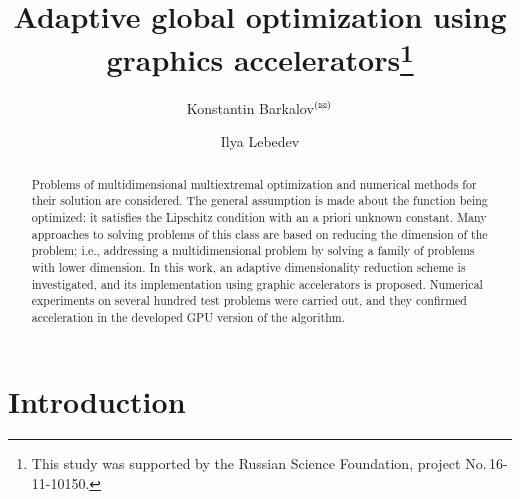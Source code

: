 \documentclass{svproc}
\def\orcidID#1{\unskip$^{[#1]}$}
\def\letter{$^{\textrm{(\Letter)}}$}
\begin{document}
\mainmatter              %
%
\title{Adaptive global optimization using graphics accelerators\thanks{This study was supported by the Russian Science Foundation, project No.\,16-11-10150.}
}
%
%
\author{Konstantin Barkalov\letter%
\and Ilya Lebedev%
}

%
%
%
	
\maketitle              %

\begin{abstract}

Problems of multidimensional multiextremal optimization and numerical methods for their solution are considered. The general assumption is made about the function being optimized: it satisfies the Lipschitz condition with an a priori unknown constant. Many approaches to solving problems of this class are based on reducing the dimension of the problem; i.e., addressing a multidimensional problem by solving a family of problems with lower dimension. In this work, an adaptive dimensionality reduction scheme is investigated, and its implementation using graphic accelerators is proposed. Numerical experiments on several hundred test problems were carried out, and they confirmed acceleration in the developed GPU version of the algorithm.


\end{abstract}

\section{Introduction}
\end{document}
